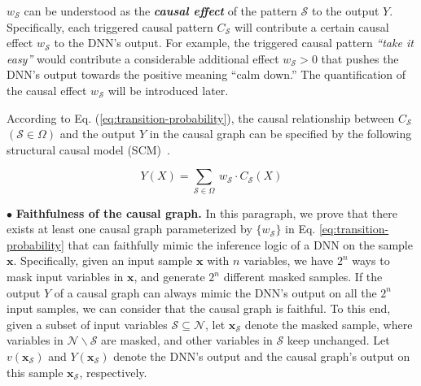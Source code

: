 {\small$w_{\mathcal{S}}$} can be understood as the \textit{\textbf{causal effect}} of the pattern {\small$\mathcal{S}$} to the output {\small$Y$}.
Specifically, each triggered causal pattern {\small$C_{\mathcal{S}}$} will contribute a certain causal effect {\small$w_{\mathcal{S}}$} to the DNN’s output.
For example, the triggered causal pattern \textit{``take it easy''} would contribute a considerable additional effect {\small$w_{\mathcal{S}}\!>\!0$} that pushes the DNN's output towards the positive meaning ``calm down.''
The quantification of the causal effect {\small$w_{\mathcal{S}}$} will be introduced later.


According to Eq. (\ref{eq:transition-probability}), the causal relationship between {\small$C_{\mathcal{S}}$} {\small$(\mathcal{S}\in\Omega)$} and the output {\small$Y$} in the causal graph can be specified by the following structural causal model (SCM)~\cite{pearl2009causality}.


\begin{small}
\begin{equation}
    Y(X)={\sum}_{\mathcal{S}\in\Omega}\ w_{\mathcal{S}}\cdot C_{\mathcal{S}}(X)
    \label{eq:scm}
\end{equation}
\end{small}


$\bullet$ \textbf{Faithfulness of the causal graph.}
In this paragraph, we prove that there exists at least one causal graph parameterized by {\small $\{w_\mathcal{S}\}$} in Eq. \eqref{eq:transition-probability} that can faithfully mimic the inference logic of a DNN on the sample {\small$\boldsymbol{x}$}.
Specifically, given an input sample {\small$\boldsymbol{x}$} with {\small$n$} variables, we have {\small$2^n$} ways to mask input variables in {\small$\boldsymbol{x}$}, and generate {\small$2^n$} different masked samples.
If the output {\small$Y$} of a causal graph can always mimic the DNN's output on all the {\small$2^n$} input samples, we can consider that the causal graph is faithful.
To this end, given a subset of input variables {\small$\mathcal{S}\!\subseteq\!\mathcal{N}$}, let {\small$\boldsymbol{x}_{\mathcal{S}}$} denote the masked sample, where variables in {\small$\mathcal{N}\backslash\mathcal{S}$} are masked, and other variables in {\small$\mathcal{S}$} keep unchanged.
Let {\small$v(\boldsymbol{x}_{\mathcal{S}})$} and {\small$Y(\boldsymbol{x}_{\mathcal{S}})$} denote the DNN's output and the causal graph's output on this sample {\small$\boldsymbol{x}_{\mathcal{S}}$}, respectively.

